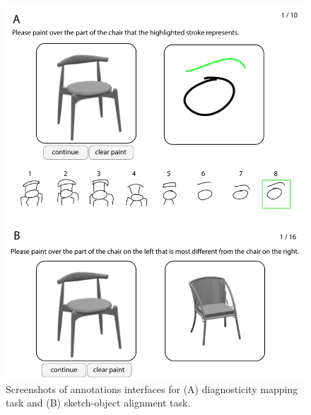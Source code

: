 \documentclass[11pt,letterpaper]{article}
\begin{document}
\begin{figure}[t!]
\includegraphics[width=.8\linewidth]{figures/stroke_mapping_screenshot.pdf}
\centering
\caption{Screenshots of annotations interfaces for (A) diagnosticity mapping task and (B) sketch-object alignment task.}
\label{fig:object_mapping_screenshot}
\end{figure}




\setlength{\bibleftmargin}{.125in}
\setlength{\bibindent}{-\bibleftmargin}


\end{document}
